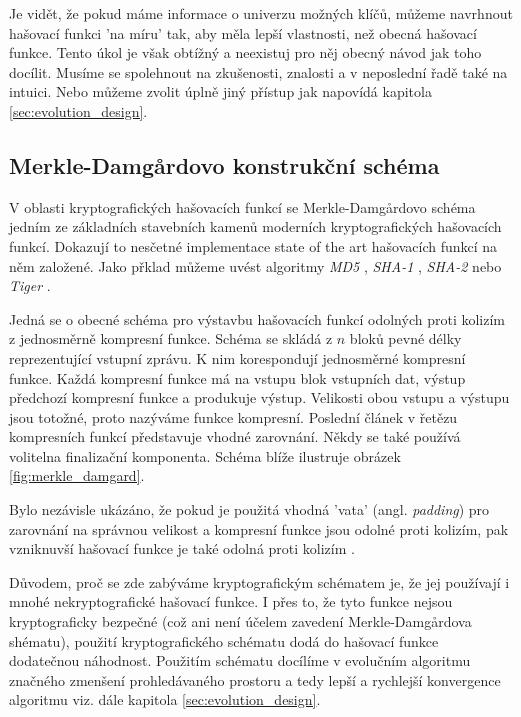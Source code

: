 Je vidět, že pokud máme informace o univerzu možných klíčů, můžeme navrhnout
hašovací funkci 'na míru' tak, aby měla lepší vlastnosti, než obecná
hašovací funkce. Tento úkol je však obtížný a neexistuj pro něj obecný
návod jak toho docílit. Musíme se spolehnout na zkušenosti, znalosti a v 
neposlední řadě také na intuici. Nebo můžeme zvolit úplně jiný přístup
jak napovídá kapitola \ref{sec:evolution_design}.

\subsection{Merkle-Damg\r{a}rdovo konstrukční schéma}
V oblasti kryptografických hašovacích funkcí se Merkle-Damg\r{a}rdovo schéma \cite{merkle0} jedním ze základních
stavebních kamenů moderních kryptografických hašovacích funkcí.
Dokazují to nesčetné implementace state of the art hašovacích funkcí na něm založené. Jako
přklad můžeme uvést algoritmy \textit{MD5} \cite{rfc1321}, \textit{SHA-1} \cite{rfc3174},
\textit{SHA-2} \cite{rfc4634} nebo \textit{Tiger} \cite{tiger}.

Jedná se o obecné schéma pro výstavbu hašovacích funkcí odolných proti kolizím z jednosměrně
kompresní funkce. Schéma se skládá z $n$ bloků pevné délky reprezentující vstupní zprávu.
K nim korespondují jednosměrné kompresní funkce. Každá kompresní funkce má na vstupu blok vstupních dat,
výstup předchozí kompresní funkce a produkuje výstup. Velikosti obou vstupu a výstupu jsou totožné,
proto nazýváme funkce kompresní. Poslední článek v řetězu kompresních funkcí představuje vhodné 
zarovnání. Někdy se také používá volitelna finalizační komponenta. Schéma blíže ilustruje obrázek 
\ref{fig:merkle_damgard}.

Bylo nezávisle ukázáno, že pokud je použitá vhodná 'vata'
(angl. \textit{padding}) pro zarovnání na správnou velikost a kompresní funkce jsou odolné
proti kolizím, pak vzniknuvší hašovací funkce je také odolná proti kolizím \cite{damgard0}.

Důvodem, proč se zde zabýváme kryptografickým schématem je, že jej používají i mnohé nekryptografické
hašovací funkce. I přes to, že tyto funkce nejsou kryptograficky bezpečné (což ani není účelem zavedení
Merkle-Damg\r{a}rdova shématu), použití kryptografického schématu dodá do hašovací funkce dodatečnou 
náhodnost. Použitím schématu docílíme v evolučním algoritmu značného zmenšení prohledávaného prostoru
a tedy lepší a rychlejší konvergence algoritmu viz. dále kapitola \ref{sec:evolution_design}.

